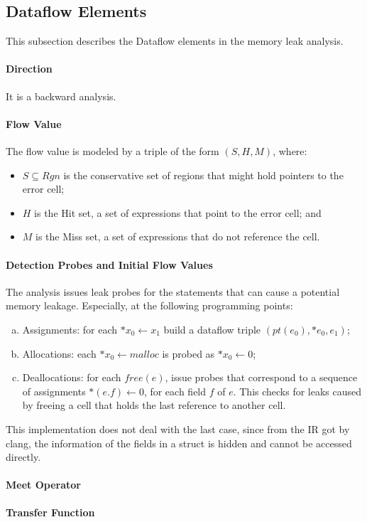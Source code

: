 \subsection{Dataflow Elements}
\label{ss:dataflow}

This subsection describes the Dataflow elements in the memory leak analysis. 

\paragraph{Direction}

It is a backward analysis.

\paragraph{Flow Value}

The flow value is modeled by a triple of the form $(S,H,M)$, where:

\begin{itemize}
  \item $S\subseteq Rgn$ is the conservative set of regions that might hold 
    pointers to the error cell;
  \item $H$ is the Hit set, a set of expressions that point to the error cell; and 
  \item $M$ is the Miss set, a set of expressions that do not reference the cell.
\end{itemize}

\paragraph{Detection Probes and Initial Flow Values}

The analysis issues leak probes for the statements that can cause a potential 
memory leakage. Especially, at the following programming points:

\begin{enumerate}[(a)]
  \item Assignments: for each $*x_0\gets x_1$ build a dataflow triple 
    $(pt(e_0),{*e_0},{e_1})$;
  \item Allocations: each $*x_0\gets malloc$ is probed as $*x_0\gets 0$;
  \item Deallocations: for each $free(e)$, issue probes that correspond to a 
    sequence of assignments $*(e.f)\gets 0$, for each field $f$ of $e$. This 
    checks for leaks caused by freeing a cell that holds the last reference 
    to another cell.
\end{enumerate}

This implementation does not deal with the last case, since from the 
\llvm IR got by clang, the information of the fields in a struct is hidden and 
cannot be accessed directly.

\paragraph{Meet Operator}



\paragraph{Transfer Function}

